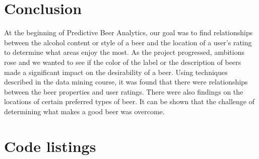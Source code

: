 \documentclass[10pt]{IEEEtran}
\begin{document}
\section{Conclusion}
At the beginning of Predictive Beer Analytics, our goal was to find relationships between the alcohol content or style of a beer and the location of a user's rating to determine what areas enjoy the most. As the project progressed, ambitions rose and we wanted to see if the color of the label or the description of beers made a significant impact on the desirability of a beer. Using techniques described in the data mining course, it was found that there were relationships between the beer properties and user ratings. There were also findings on the locations of certain preferred types of beer. It can be shown that the challenge of determining what makes a good beer was overcome.





\clearpage
\onecolumn
\appendices
\section{Code listings}

\lstlistoflistings

\label{listing:PBA}

\label{listing:Untappd}

\label{listing:keywordExtractor}

\label{listing:keywordClassifier}

\label{listing:dataPoints}

\label{listing:PBAMap}

\label{listing:labels}

\label{listing:fileReader}
\end{document}

